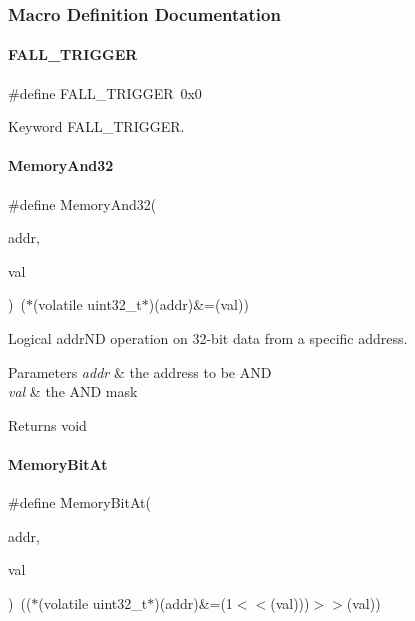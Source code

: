 \subsubsection{Macro Definition Documentation}
\mbox{\label{a00020_a9bbaf5b9e2125c7597249c7113b20e6c}} 
\paragraph{\texorpdfstring{F\+A\+L\+L\+\_\+\+T\+R\+I\+G\+G\+ER}{FALL\_TRIGGER}}
{\footnotesize\ttfamily \#define F\+A\+L\+L\+\_\+\+T\+R\+I\+G\+G\+ER~0x0}

Keyword F\+A\+L\+L\+\_\+\+T\+R\+I\+G\+G\+ER. \mbox{\label{a00020_ad87cedffcaadc51db22594fce55173d4}} 
\paragraph{\texorpdfstring{Memory\+And32}{MemoryAnd32}}
{\footnotesize\ttfamily \#define Memory\+And32(\begin{DoxyParamCaption}\item[{}]{addr,  }\item[{}]{val }\end{DoxyParamCaption})~($\ast$(volatile uint32\+\_\+t$\ast$)(addr)\&=(val))}



Logical addr\+ND operation on 32-\/bit data from a specific address. 


\begin{DoxyParams}{Parameters}
{\em addr} & the address to be A\+ND \\
\hline
{\em val} & the A\+ND mask \\
\hline
\end{DoxyParams}
\begin{DoxyReturn}{Returns}
void 
\end{DoxyReturn}
\mbox{\label{a00020_afc530c7e6b49b0ca97c1ad9dac1c4750}} 
\paragraph{\texorpdfstring{Memory\+Bit\+At}{MemoryBitAt}}
{\footnotesize\ttfamily \#define Memory\+Bit\+At(\begin{DoxyParamCaption}\item[{}]{addr,  }\item[{}]{val }\end{DoxyParamCaption})~(($\ast$(volatile uint32\+\_\+t$\ast$)(addr)\&=(1$<$$<$(val)))$>$$>$(val))}



